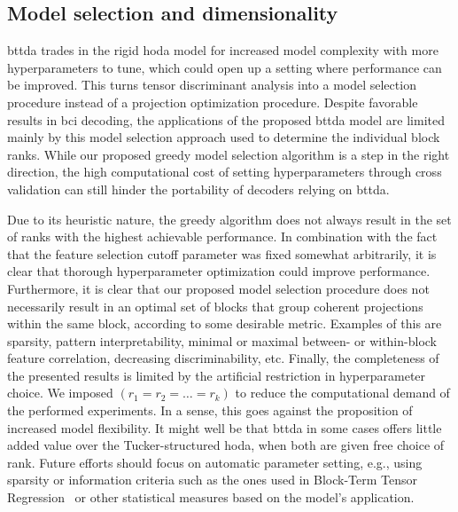 \subsection{Model selection and dimensionality}

\Ac{bttda} trades in the rigid \ac{hoda} model for increased model complexity with more
hyperparameters to tune, which could open up a setting where performance can be
improved.
This turns tensor discriminant analysis into a model selection procedure
instead of a projection optimization procedure.
Despite favorable results in \ac{bci} decoding, the applications of the proposed
\ac{bttda} model are limited mainly by this model selection approach used
to determine the individual block ranks.
While our proposed greedy model selection algorithm is a step in the right
direction, the high computational cost of setting hyperparameters through cross
validation can still hinder the portability of decoders relying on
\ac{bttda}.

Due to its heuristic nature, the greedy algorithm does not always result in the
set of ranks with the highest achievable performance.
In combination with the fact that the feature selection cutoff parameter was
fixed somewhat arbitrarily, it is clear that thorough
hyperparameter optimization could improve performance.
Furthermore, it is clear that our proposed model selection procedure does not
necessarily result in an optimal set of blocks that group coherent projections
within the same block, according to some desirable metric.
Examples of this are sparsity, pattern interpretability, minimal or maximal
between- or within-block feature correlation, decreasing discriminability, etc.
Finally, the completeness of the presented results is limited by the artificial
restriction in hyperparameter choice.
We imposed $(r_1=r_2=\ldots=r_k)$ to reduce the computational demand of
the performed experiments.
In a sense, this goes against the proposition of increased model flexibility.
It might well be that \ac{bttda} in some cases offers little added value over the
Tucker-structured \ac{hoda}, when both are given free choice of rank.
Future efforts should focus on automatic parameter setting, e.g., using sparsity
or information criteria such as the ones used in Block-Term Tensor Regression~\cite{Faes2022}
or other statistical measures based on the model's application.

